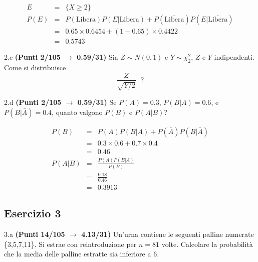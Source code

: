 \documentclass[
  11pt,
]{book}
\theoremstyle{mytheoremstyle}
\theoremstyle{mydefstyle}
\newenvironment{sol}
  {
  \begin{tcolorbox}[enhanced,breakable,arc=0.1mm,boxrule=1pt,colback=white,colframe=iblue,
  title=\bf \fontfamily{lmss}\selectfont \hspace{.5 cm} Soluzione,drop fuzzy shadow]

}{
\end{tcolorbox}
  }
\begin{document}
\begin{sol}
\begin{eqnarray*}
E &=& \{X\ge 2\}\\
P(E) &=& P(\text{Libera})P(E|\text{Libera})+P\left(\overline{\text{Libera}}\right)P\left(E|\overline{\text{Libera}}\right)\\
   &=&  0.65\times0.6454+(1-0.65)\times 0.4422\\
  &=& 0.5743
\end{eqnarray*}

\end{sol}

2.c \textbf{(Punti 2/105 \(\rightarrow\) 0.59/31)} Sia \(Z\sim N(0,1)\) e \(Y\sim \chi^2_2\), \(Z\) e \(Y\) indipendenti.
Come si distribuisce
\[
\frac{Z}{\sqrt{Y/2}} ~~~?
\]

2.d \textbf{(Punti 2/105 \(\rightarrow\) 0.59/31)} Se \(P(A)=0.3\), \(P(B|A)=0.6\), e \(P(B|\bar A)=0.4\), quanto valgono \(P(B)\) e \(P(A|B)\)?

\begin{sol}
\begin{eqnarray*}
P(B) &=& P(A)P(B|A)+P(\bar A)P(B|\bar A)\\
     &=& 0.3\times0.6+0.7\times 0.4\\
     &=& 0.46\\
P(A|B) &=& \frac {P(A)P(B|A)}{P(B)}\\
       &=& \frac {0.18}{0.46}\\
       &=& 0.3913
\end{eqnarray*}

\end{sol}

\subsection{Esercizio 3}\label{esercizio-3-31}

3.a \textbf{(Punti 14/105 \(\rightarrow\) 4.13/31)} Un'urna contiene le seguenti palline numerate \{3,5,7,11\}. Si estrae con reintroduzione per \(n=81\) volte.
Calcolare la probabilità che la media delle palline estratte sia inferiore a 6.
\end{document}
